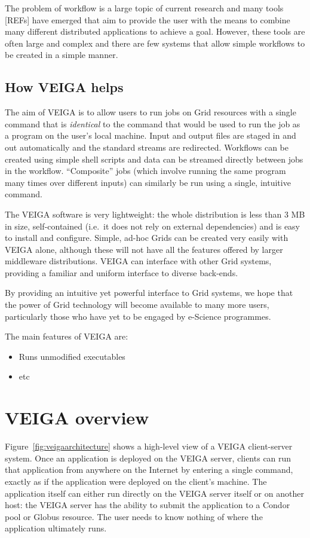 \documentclass[a4paper]{article}
\begin{document}
\begin{multicols}{2}
The problem of workflow is a large topic of current research and many tools [REFs] have emerged that aim to provide the user with the means to combine many different distributed applications to achieve a goal.  However, these tools are often large and complex and there are few systems that allow simple workflows to be created in a simple manner.

\subsection{How VEIGA helps}
The aim of VEIGA is to allow users to run jobs on Grid resources with a single command that is {\em identical\/} to the command that would be used to run the job as a program on the user's local machine.  Input and output files are staged in and out automatically and the standard streams are redirected.  Workflows can be created using simple shell scripts and data can be streamed directly between jobs in the workflow.  ``Composite'' jobs (which involve running the same program many times over different inputs) can similarly be run using a single, intuitive command.

The VEIGA software is very lightweight: the whole distribution is less than 3 MB in size, self-contained (i.e.\ it does not rely on external dependencies) and is easy to install and configure.  Simple, ad-hoc Grids can be created very easily with VEIGA alone, although these will not have all the features offered by larger middleware distributions.  VEIGA can interface with other Grid systems, providing a familiar and uniform interface to diverse back-ends.

By providing an intuitive yet powerful interface to Grid systems, we hope that the power of Grid technology will become available to many more users, particularly those who have yet to be engaged by e-Science programmes.

The main features of VEIGA are:
\begin{itemize}
\item Runs unmodified executables
\item etc
\end{itemize}


\section{VEIGA overview}
Figure~\ref{fig:veigaarchitecture} shows a high-level view of a VEIGA client-server system.  Once an application is deployed on the VEIGA server, clients can run that application from anywhere on the Internet by entering a single command, exactly as if the application were deployed on the client's machine.  The application itself can either run directly on the VEIGA server itself or on another host: the VEIGA server has the ability to submit the application to a Condor pool or Globus resource.  The user needs to know nothing of where the application ultimately runs.


\end{multicols}
\end{document}
